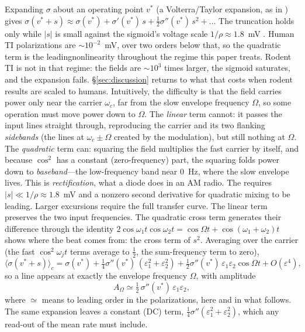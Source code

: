 \documentclass[11pt,a4paper]{article}
\newcommand{\Sig}{\sigma}
\newcommand{\half}{\tfrac{1}{2}}
\providecommand{\DIFaddtex}[1]{{\protect\color{blue} \sf #1}} %
\providecommand{\DIFdeltex}[1]{{\protect\color{red} \scriptsize #1}} %
\providecommand{\DIFaddbegin}{} %
\providecommand{\DIFaddend}{} %
\providecommand{\DIFdelbegin}{} %
\providecommand{\DIFdelend}{} %
\providecommand{\DIFadd}[1]{\texorpdfstring{\DIFaddtex{#1}}{#1}} %
\providecommand{\DIFdel}[1]{\texorpdfstring{\DIFdeltex{#1}}{}} %
\begin{document}
Expanding $\Sig$ about an operating point $v^*$ (a Volterra/Taylor expansion, as
in \cite{ruffini2025ham}) gives
$\Sig(v^*+s)\approx\Sig(v^*)+\Sig'(v^*)\,s+\half\Sig''(v^*)\,s^2+\dots$
The truncation \DIFdelbegin \DIFdel{holds only while $|s|$ is small against the sigmoid's voltage scale
$1/\rho\approx1.8$~mV . Human TI polarizations are $\sim 10^{-2}$~mV, over two orders below
that, so the quadratic term is the leadingnonlinearity throughout the regime this paper
treats. Rodent TI is not in that regime: the fields are $\sim 10^3$ times larger, the
sigmoid saturates, and the expansion fails.
\S\ref{sec:discussion} returns to what that
costs when rodent results are scaled to humans.
Intuitively, the difficulty is that the field carries power only near the carrier
$\omega_c$, far from the slow envelope frequency $\Omega$, so some operation must move
power down to $\Omega$. The \emph{linear} term cannot: it passes the input lines straight
through, reproducing the carrier and its two flanking \emph{sidebands} (the lines at
$\omega_c\pm\Omega$ created by the modulation), but still nothing at $\Omega$. The \emph{quadratic} term
can: squaring the field multiplies the fast carrier by itself, and
because $\cos^2$ has a constant (zero-frequency) part, the squaring folds power down to
\emph{baseband}---the low-frequency band near $0$~Hz, where the slow envelope lives. This
is \emph{rectification}, what a diode does in an AM radio. The }\DIFdelend \DIFaddbegin \DIFadd{requires $|s|\ll1/\rho\approx1.8$~mV and a nonzero second derivative
for quadratic mixing to be leading. Larger excursions require the full transfer curve.
The linear term preserves the two input frequencies. The quadratic cross term
generates their difference through the }\DIFaddend identity
$2\cos\omega_1t\cos\omega_2t=\cos\Omega t+\cos(\omega_1+\omega_2)t$\DIFdelbegin \DIFdel{shows where the beat
comes from: the cross term of $s^2$}\DIFdelend .
Averaging over the carrier (the fast
$\cos^2\omega_jt$ terms average to $\half$, the sum-frequency term to zero),
\begin{equation}
\big\langle\Sig(v^*+s)\big\rangle_c
=\Sig(v^*)+\tfrac14\Sig''(v^*)\,(\varepsilon_1^2+\varepsilon_2^2)
+\tfrac12\Sig''(v^*)\,\varepsilon_1\varepsilon_2\cos\Omega t+O(\varepsilon^4),
\label{eq:taylor}
\end{equation}
so a line appears at exactly the envelope frequency $\Omega$, with amplitude
\begin{equation}
A_\Omega\simeq\half\,\Sig''(v^*)\,\varepsilon_1\varepsilon_2 ,
\label{eq:demod}
\end{equation}
where $\simeq$ means to leading order in the polarizations, here and in what follows. The
same expansion leaves a constant (DC) term, $\tfrac14\Sig''(\varepsilon_1^2+\varepsilon_2^2)$,
which any read-out of the mean rate must include.
\end{document}
